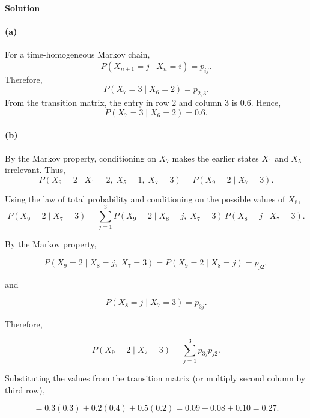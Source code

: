 \documentclass[hidelinks]{article}
\begin{document}
\medskip




\noindent \textbf{Solution}

\paragraph{(a)}
For a time-homogeneous Markov chain,
\[
P(X_{n+1}=j \mid X_n=i)=p_{ij}.
\]
Therefore,
\[
P(X_7=3 \mid X_6=2)=p_{2,3}.
\]
From the transition matrix, the entry in row $2$ and column $3$ is $0.6$. Hence,
\[
\boxed{P(X_7=3 \mid X_6=2)=0.6.}
\]

\paragraph{(b)}
By the Markov property, conditioning on $X_7$ makes the earlier states $X_1$ and $X_5$ irrelevant. Thus,
\[
P(X_9=2 \mid X_1=2,\; X_5=1,\; X_7=3)
= P(X_9=2 \mid X_7=3).
\]

\noindent Using the law of total probability and conditioning on the possible values of $X_8$,
\[
P(X_9=2 \mid X_7=3)
= \sum_{j=1}^3 P(X_9=2 \mid X_8=j,\; X_7=3)\,P(X_8=j \mid X_7=3).
\]

\noindent By the Markov property,

\[
P(X_9=2 \mid X_8=j,\; X_7=3)=P(X_9=2 \mid X_8=j)=p_{j2},
\]

\noindent and

\[
P(X_8=j \mid X_7=3)=p_{3j}.
\]

\noindent Therefore,

\[
P(X_9=2 \mid X_7=3)
= \sum_{j=1}^3 p_{3j}p_{j2}.
\]

\noindent Substituting the values from the transition matrix (or multiply second column by third row),

\[
=0.3(0.3)+0.2(0.4)+0.5(0.2)
=0.09+0.08+0.10
=0.27.
\]
\end{document}
